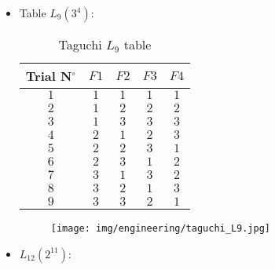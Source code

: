 \begin{itemize}
		\item Table $L_9 (3^4)$:
		\begin{table}[H]\centering
			\begin{center}
			\begin{tabular}{|c|c|c|c|c|}
			\hline
			\multicolumn{1}{c}{\cellcolor{black!30}\textbf{Trial N${}^\circ$}} & 
			\multicolumn{1}{c}{\cellcolor{black!30}$F1$} & 
			\multicolumn{1}{c}{\cellcolor{black!30}$F2$} & 
			\multicolumn{1}{c}{\cellcolor{black!30}$F3$} & 
			\multicolumn{1}{c}{\cellcolor{black!30}$F4$} \\ \hline
		  	$1$ & $1$ & $1$ & $1$ & $1$\\ \hline
		  	$2$ & $1$ & $2$ & $2$ & $2$\\ \hline
		  	$3$ & $1$ & $3$ & $3$ & $3$\\ \hline
		  	$4$ & $2$ & $1$ & $2$ & $3$\\ \hline
		  	$5$ & $2$ & $2$ & $3$ & $1$\\ \hline
		  	$6$ & $2$ & $3$ & $1$ & $2$\\ \hline
		  	$7$ & $3$ & $1$ & $3$ & $2$\\ \hline
		  	$8$ & $3$ & $2$ & $1$ & $3$\\ \hline
		  	$9$ & $3$ & $3$ & $2$ & $1$\\ \hline
		 		\end{tabular}
			\end{center}
			\caption{Taguchi $L_9$ table}
		\end{table}
		\begin{figure}[H]
			\begin{center}
			\texttt{[image: img/engineering/taguchi\_L9.jpg]}
			\end{center}	
		\end{figure}
		
		\item $L_{12} (2^{11})$:
		

\end{itemize}
